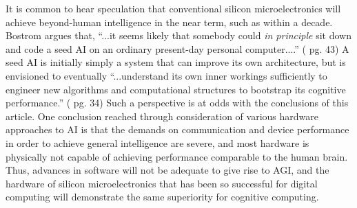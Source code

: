 It is common to hear speculation that conventional silicon microelectronics will achieve beyond-human intelligence in the near term, such as within a decade. Bostrom argues that, ``...it seems likely that somebody could \textit{in principle} sit down and code a seed AI on an ordinary present-day personal computer....'' (\cite{bo2014} pg. 43) A seed AI is initially simply a system that can improve its own architecture, but is envisioned to eventually ``...understand its own inner workings sufficiently to engineer new algorithms and computational structures to bootstrap its cognitive performance.'' (\cite{bo2014} pg. 34) Such a perspective is at odds with the conclusions of this article. One conclusion reached through consideration of various hardware approaches to AI is that the demands on communication and device performance in order to achieve general intelligence are severe, and most hardware is physically not capable of achieving performance comparable to the human brain. Thus, advances in software will not be adequate to give rise to AGI, and the hardware of silicon microelectronics that has been so successful for digital computing will demonstrate the same superiority for cognitive computing.

